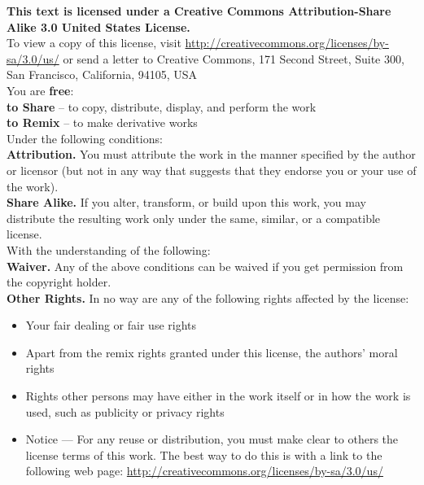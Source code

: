\textbf{This text is licensed under a Creative Commons Attribution-Share Alike 3.0 United States License.}\\

To view a copy of this license, visit \href{http://creativecommons.org/licenses/by-sa/3.0/us/}{http://creativecommons.org/licenses/by-sa/3.0/us/} or send a letter to Creative Commons, 171 Second Street, Suite 300, San Francisco, California, 94105, USA\\

You are \textbf{free}:\\
\hspace*{0.25in} \textbf{to Share} -- to copy, distribute, display, and perform the work\\
\hspace*{0.25in} \textbf{to Remix} -- to make derivative works\\

Under the following conditions:\\
\hspace*{0.25in} \textbf{Attribution.}  You must attribute the work in the manner specified by the author or licensor (but not in any way that suggests that they endorse you or your use of the work).\\
\hspace*{0.25in} \textbf{Share Alike.}  If you alter, transform, or build upon this work, you may distribute the resulting work only under the same, similar, or a compatible license.\\

With the understanding of the following:\\
\hspace*{0.25in} \textbf{Waiver.}  Any of the above conditions can be waived if you get permission from the copyright holder.\\
\hspace*{0.25in} \textbf{Other Rights.}  In no way are any of the following rights affected by the license:
\begin{itemize}
\item Your fair dealing or fair use rights
\item Apart from the remix rights granted under this license, the authors' moral rights
\item Rights other persons may have either in the work itself or in how the work is used, such as publicity or privacy rights
\item Notice --- For any reuse or distribution, you must make clear to others the license terms of this work.  The best way to do this is with a link to the following web page: \href{http://creativecommons.org/licenses/by-sa/3.0/us/}{http://creativecommons.org/licenses/by-sa/3.0/us/}
\end{itemize}


